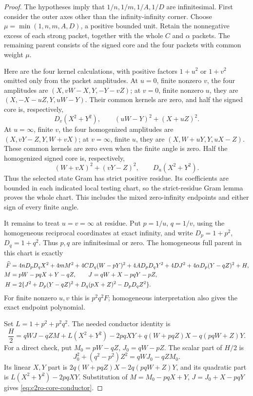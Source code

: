 \begin{proof}
The hypotheses imply that $1/n,1/m,1/A,1/D$ are infinitesimal.
First consider the outer axes other than the infinity-infinity corner.
Choose $\mu=\min(1,n,m,A,D)$, a positive bounded unit.  Retain the
nonnegative excess of each strong packet, together with the whole
$C$ and $\alpha$ packets.  The remaining parent consists of the signed
core and the four packets with common weight $\mu$.

Here are the four kernel calculations, with positive factors
$1+u^2$ or $1+v^2$ omitted only from the packet amplitudes.
At $u=0$, finite nonzero $v$, the four amplitudes are
$(X,vW-X,Y,-Y-vZ)$; at $v=0$, finite nonzero $u$, they are
$(X,-X-uZ,Y,uW-Y)$.  Their common kernels are zero, and half the
signed core is, respectively,
\[
 D_v(X^2+Y^2),\qquad (uW-Y)^2+(X+uZ)^2.
\]
At $u=\infty$, finite $v$, the four homogenized amplitudes are
$(X,vY-Z,Y,W+vX)$; at $v=\infty$, finite $u$, they are
$(X,W+uY,Y,uX-Z)$.  These common kernels are zero even when the
finite angle is zero.  Half the homogenized signed core is, respectively,
\[
 (W+vX)^2+(vY-Z)^2,\qquad D_u(X^2+Y^2).
\]
Thus the selected state Gram has strict positive residue.  Its
coefficients are bounded in each indicated local testing chart, so the
strict-residue Gram lemma proves the whole chart.  This includes the
mixed zero-infinity endpoints and either sign of every finite angle.

It remains to treat $u=v=\infty$ at residue.  Put $p=1/u$, $q=1/v$,
using the homogeneous reciprocal coordinates at exact infinity, and
write $D_p=1+p^2$, $D_q=1+q^2$.  Thus $p,q$ are infinitesimal or zero.
The homogeneous full parent in this chart is exactly
\begin{align}
\widehat F={}&4nD_pD_qX^2+4mM^2+4CD_q(W-pY)^2
       +4AD_pD_qY^2+4DJ^2+4\alpha D_p(Y-qZ)^2+H,\notag\\
 M={}&pW-pqX+Y-qZ,\qquad
 J=qW+X-pqY-pZ,\notag\\
 H={}&2\{J^2+D_p(Y-qZ)^2+D_q(pX+Z)^2-D_pD_qZ^2\}.
\label{eq:c2ro-parent}
\end{align}
For finite nonzero $u,v$ this is $p^2q^2F$; homogeneous interpretation
also gives the exact endpoint polynomial.

Set $L=1+p^2+p^2q^2$.  The needed conductor identity is
\begin{equation}
\frac H2=qWJ-qZM+L(X^2+Y^2)-2pqXY
             +q(W+pqZ)X-q(pqW+Z)Y.
\label{eq:c2ro-core-conductor}
\end{equation}
For a direct check, put $M_0=pW-qZ$, $J_0=qW-pZ$.  The scalar part
of $H/2$ is
\[
 J_0^2+(q^2-p^2)Z^2=qWJ_0-qZM_0.
\]
Its linear $X,Y$ part is
$2q(W+pqZ)X-2q(pqW+Z)Y$, and its quadratic part is
$L(X^2+Y^2)-2pqXY$.  Substitution of
$M=M_0-pqX+Y$, $J=J_0+X-pqY$ gives
\eqref{eq:c2ro-core-conductor}.


\end{proof}
